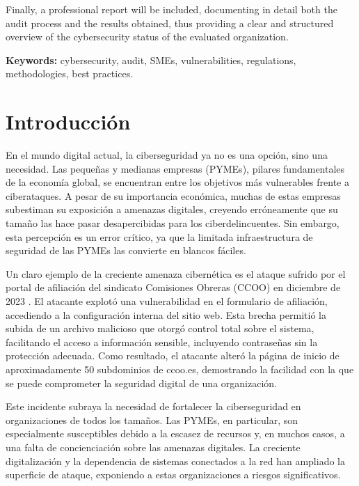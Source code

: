 \documentclass[a4paper, 10pt]{article}
\begin{document}
Finally, a professional report will be included, documenting in detail both the audit process and the results obtained, thus providing a clear and structured overview of the cybersecurity status of the evaluated organization.
\par\vspace{0.5cm}
\textbf{Keywords:} cybersecurity, audit, SMEs, vulnerabilities, regulations, methodologies, best practices.
\clearpage



\section{Introducción}
En el mundo digital actual, la ciberseguridad ya no es una opción, sino una necesidad. Las pequeñas y medianas empresas (PYMEs), pilares fundamentales de la economía global, se encuentran entre los objetivos más vulnerables frente a ciberataques. A pesar de su importancia económica, 
muchas de estas empresas subestiman su exposición a amenazas digitales, creyendo erróneamente que su tamaño las hace pasar desapercibidas para los ciberdelincuentes. Sin embargo, esta percepción es un error crítico, ya que la limitada infraestructura de seguridad de las 
PYMEs las convierte en blancos fáciles. 
\par\vspace{0.5cm}

Un claro ejemplo de la creciente amenaza cibernética es el ataque sufrido por el portal de afiliación del sindicato Comisiones Obreras (CCOO) en diciembre de 2023 \cite{farlopa}. El atacante explotó una vulnerabilidad en el formulario de afiliación, accediendo a la configuración interna del sitio web. Esta brecha permitió la subida de un archivo malicioso que otorgó control total sobre el sistema, facilitando el acceso a información sensible, incluyendo contraseñas sin la protección adecuada. Como resultado, el atacante alteró la página de inicio de aproximadamente 50 subdominios de ccoo.es, demostrando la facilidad con la que se puede comprometer la seguridad digital de una organización.
\par\vspace{0.5cm}

Este incidente subraya la necesidad de fortalecer la ciberseguridad en organizaciones de todos los tamaños. Las PYMEs, en particular, son especialmente susceptibles debido a la escasez de recursos y, en muchos casos, a una falta de concienciación sobre las amenazas digitales. 
La creciente digitalización y la dependencia de sistemas conectados a la red han ampliado la superficie de ataque, exponiendo a estas organizaciones a riesgos significativos.
\par\vspace{0.5cm}
\end{document}
